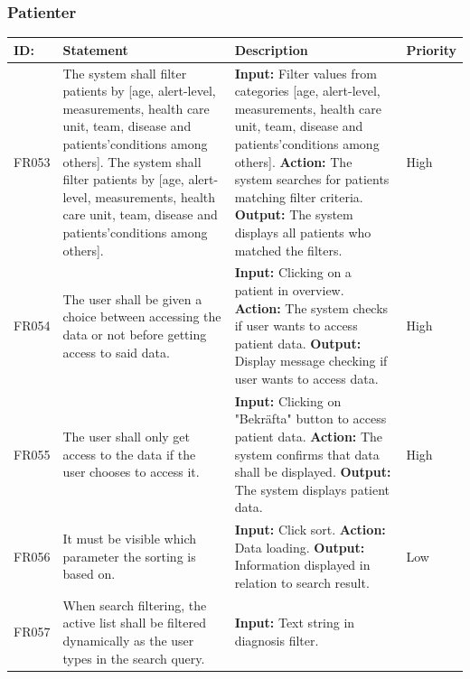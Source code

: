 \documentclass{scrreprt}
\begin{document}
\subsubsection{Patienter}
\begin{center}
\begin{tabularx}{\linewidth}{| l | X | X | l |}
\hline
\textbf{ID:} & \textbf{Statement} & \textbf{Description} & \textbf{Priority} \\ 
\hline
FR053 & The system shall filter patients by [age, alert-level, measurements, health care unit, team, disease and patients’conditions among others]. The system shall filter patients by [age, alert-level, measurements, health care unit, team, disease and patients’conditions among others]. & \textbf{Input:} Filter values from categories [age, alert-level, measurements, health care unit, team, disease and patients’conditions among others].
\newline \textbf{Action:} The system searches for patients matching filter criteria.
\newline \textbf{Output:} The system displays all patients who matched the filters. & High \\ 
\hline
FR054 & The user shall be given a choice between accessing the data or not before getting access to said data. & \textbf{Input:} Clicking on a patient in overview.
\newline \textbf{Action:} The system checks if user wants to access patient data.
\newline \textbf{Output:} Display message checking if user wants to access data. & High \\ 
\hline
FR055 & The user shall only get access to the data if the user chooses to access it. & \textbf{Input:} Clicking on "Bekräfta" button to access patient data.
\newline \textbf{Action:} The system confirms that data shall be displayed.
\newline \textbf{Output:} The system displays patient data. & High \\ 
\hline
FR056 & It must be visible which parameter the sorting is based on. & \textbf{Input:} Click sort.
\newline \textbf{Action:} Data loading.
\newline \textbf{Output:} Information displayed in relation to search result. & Low \\ 
\hline
FR057 & When search filtering, the active list shall be filtered dynamically as the user types in the search query. & \textbf{Input:} Text string in diagnosis filter.

\end{tabularx}
\end{center}
\end{document}
